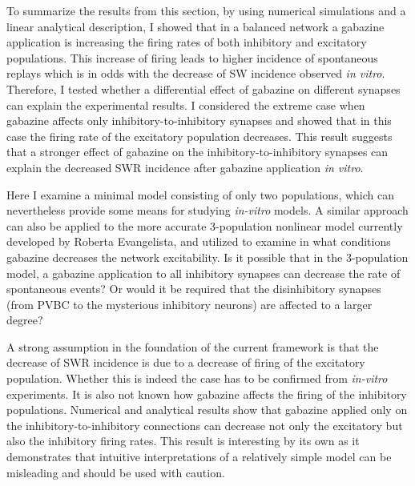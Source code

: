     To summarize the results from this section, by using numerical simulations
    and a linear analytical description, I showed that in a balanced network a
    gabazine application is increasing the firing rates of both inhibitory and
    excitatory populations. This increase of firing leads to higher incidence
    of spontaneous replays which is in odds with the decrease of SW incidence
    observed {\textit{in vitro}}. Therefore, I tested whether a differential
    effect of gabazine on different synapses can explain the experimental
    results. I considered the extreme case when gabazine affects only
    inhibitory-to-inhibitory synapses and showed that in this case the firing
    rate of the excitatory population decreases. This result suggests that a
    stronger effect of gabazine on the inhibitory-to-inhibitory synapses can
    explain the decreased SWR incidence after gabazine application {\textit{in
    vitro}}.
    
    Here I examine a minimal model consisting of only two populations, which
    can nevertheless provide some means for studying \textit{in-vitro} models.
    A similar approach can also be applied to the more accurate 3-population
    nonlinear model currently developed by Roberta Evangelista, and utilized to
    examine in what conditions gabazine decreases the network excitability. Is
    it possible that in the 3-population model, a gabazine application to all
    inhibitory synapses can decrease the rate of spontaneous events? Or would
    it be required that the disinhibitory synapses (from PVBC to the mysterious
    inhibitory neurons) are affected to a larger degree?

    A strong assumption in the foundation of the current framework is that the
    decrease of SWR incidence is due to a decrease of firing of the excitatory
    population. Whether this is indeed the case has to be confirmed from
    \textit{in-vitro} experiments. It is also not known how gabazine affects
    the firing of the inhibitory populations. Numerical and analytical results
    show that gabazine applied only on the inhibitory-to-inhibitory connections
    can decrease not only the excitatory but also the inhibitory firing rates.
    This result is interesting by its own as it demonstrates that intuitive
    interpretations of a relatively simple model can be misleading and should
    be used with caution.
    
